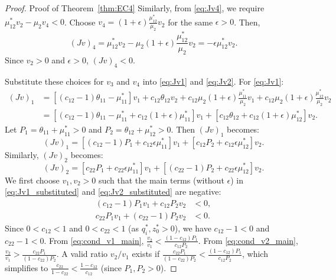 \begin{proof}{Proof of Theorem~\ref{thm:EC4}}
Similarly, from \eqref{eq:Jv4}, we require $\mu_{12}^{*}v_2 - \mu_{2}v_4 < 0$. Choose $v_4 = (1+\epsilon)\frac{\mu_{12}^{*}}{\mu_{2}}v_2$ for the same $\epsilon > 0$. Then,
\begin{equation*}
  (Jv)_4 = \mu_{12}^{*}v_2 - \mu_{2}(1+\epsilon)\frac{\mu_{12}^{*}}{\mu_{2}}v_2 = -\epsilon\mu_{12}^{*}v_2.
\end{equation*}
Since $v_2 > 0$ and $\epsilon > 0$, $(Jv)_4 < 0$.

Substitute these choices for $v_3$ and $v_4$ into \eqref{eq:Jv1} and \eqref{eq:Jv2}.
For \eqref{eq:Jv1}:
\begin{align*}
(Jv)_1 &= [(c_{12}-1)\theta_{11} - \mu_{11}^{*}]v_1 + c_{12}\theta_{12}v_2 + c_{12}\mu_{2}(1+\epsilon)\frac{\mu_{11}^{*}}{\mu_{2}}v_1 + c_{12}\mu_{2}(1+\epsilon)\frac{\mu_{12}^{*}}{\mu_{2}}v_2 \\
&= [(c_{12}-1)\theta_{11} - \mu_{11}^{*} + c_{12}(1+\epsilon)\mu_{11}^{*}]v_1 + [c_{12}\theta_{12} + c_{12}(1+\epsilon)\mu_{12}^{*}]v_2.
\end{align*}
Let $P_1 = \theta_{11} + \mu_{11}^{*} > 0$ and $P_2 = \theta_{12} + \mu_{12}^{*} > 0$. Then $(Jv)_1$ becomes:
\begin{equation}
(Jv)_1 = [(c_{12}-1)P_1 + c_{12}\epsilon\mu_{11}^{*}]v_1 + [c_{12}P_2 + c_{12}\epsilon\mu_{12}^{*}]v_2. \label{eq:Jv1_substituted}
\end{equation}
Similarly, $(Jv)_2$ becomes:
\begin{equation}
(Jv)_2 = [c_{22}P_1 + c_{22}\epsilon\mu_{11}^{*}]v_1 + [(c_{22}-1)P_2 + c_{22}\epsilon\mu_{12}^{*}]v_2. \label{eq:Jv2_substituted}
\end{equation}
We first choose $v_1, v_2 > 0$ such that the main terms (without $\epsilon$) in \eqref{eq:Jv1_substituted} and \eqref{eq:Jv2_substituted} are negative:
\begin{align}
(c_{12}-1)P_1 v_1 + c_{12}P_2 v_2 &< 0 \label{eq:cond_v1_main}, \\
c_{22}P_1 v_1 + (c_{22}-1)P_2 v_2 &< 0 \label{eq:cond_v2_main}.
\end{align}
Since $0 < c_{12} < 1$ and $0 < c_{22} < 1$ (as $q_i^*, z_0^* > 0$), we have $c_{12}-1 < 0$ and $c_{22}-1 < 0$.
From \eqref{eq:cond_v1_main}, $\frac{v_2}{v_1} < \frac{(1-c_{12})P_1}{c_{12}P_2}$.
From \eqref{eq:cond_v2_main}, $\frac{v_2}{v_1} > \frac{c_{22}P_1}{(1-c_{22})P_2}$.
A valid ratio $v_2/v_1$ exists if $\frac{c_{22}P_1}{(1-c_{22})P_2} < \frac{(1-c_{12})P_1}{c_{12}P_2}$, which simplifies to $\frac{c_{22}}{1-c_{22}} < \frac{1-c_{12}}{c_{12}}$ (since $P_1, P_2 > 0$).

\end{proof}
